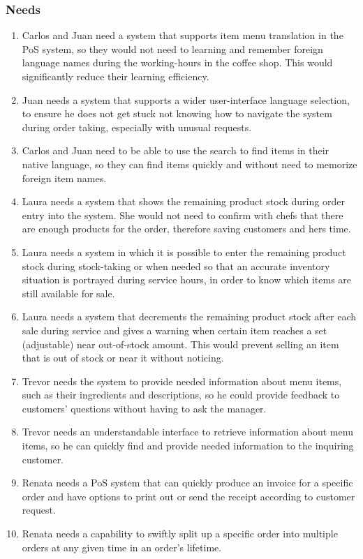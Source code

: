 \documentclass{article}
\begin{document}
\subsubsection{Needs}
\begin{enumerate}[label=N\arabic*.]
    \item Carlos and Juan need a system that supports item menu translation in the PoS system, so they would not need to learning and remember foreign language names during the working-hours in the coffee shop. This would significantly reduce their learning efficiency.
    \item Juan needs a system that supports a wider user-interface language selection, to ensure he does not get stuck not knowing how to navigate the system during order taking, especially with unusual requests.
    \item Carlos and Juan need to be able to use the search to find items in their native language, so they can find items quickly and without need to memorize foreign item names.
    \item Laura needs a system that shows the remaining product stock during order entry into the system. She would not need to confirm with chefs that there are enough products for the order, therefore saving customers and hers time.
    \item Laura needs a system in which it is possible to enter the remaining product stock during stock-taking or when needed so that an accurate inventory situation is portrayed during service hours, in order to know which items are still available for sale.
    \item Laura needs a system that decrements the remaining product stock after each sale during service and gives a warning when certain item reaches a set (adjustable) near out-of-stock amount. This would prevent selling an item that is out of stock or near it without noticing.
    \item Trevor needs the system to provide needed information about menu items, such as their ingredients and descriptions, so he could provide feedback to customers' questions without having to ask the manager.
    \item Trevor needs an understandable interface to retrieve information about menu items, so he can quickly find and provide needed information to the inquiring customer. 
    \item Renata needs a PoS system that can quickly produce an invoice for a specific order and have options to print out or send the receipt according to customer request.
    \item Renata needs a capability to swiftly split up a specific order into multiple orders at any given time in an order's lifetime.
\end{enumerate}
\end{document}
